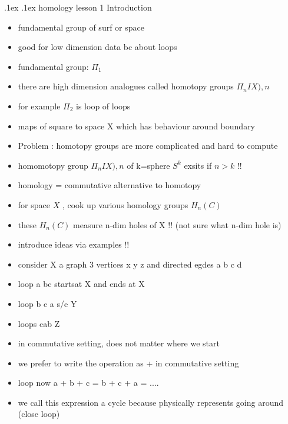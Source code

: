 \documentclass[10pt,landscape,a4paper]{article}
\makeatletter
\renewcommand{\section}{\@startsection{section}{1}{0mm}%
                                {.1ex}%
                                {.1ex}%
                                {\color{blue}\sffamily\small\bfseries}}
\makeatother
\begin{document}
\newcommand{\sucht}{\ \wasytherefore\ }

\pagecolor{light-gray}	
\normalsize

\begin{multicols*}{4}

\begin{spacing}{0.1}

\section{homology lesson 1 Introduction}%
\label{sec:first_lesson}

\begin{itemize}
  \item fundamental group of surf or space
  \item good for low dimension data bc about loops
  \item fundamental group: $ \Pi_{1}  $ 
  \item there are high dimension analogues called homotopy groups  $ \Pi_{n}IX) , n $ 
  \item for example $ \Pi_{2}  $ is loop of loops 
  \item maps of square to space X which has behaviour around boundary
  \item Problem : homotopy groups are more complicated and hard to compute
  \item homomotopy group $ \Pi_{n}IX) , n $ of k=sphere $S^k$ exsits if $n > k$ !!
  \item homology = commutative alternative to homotopy
  \item for space $X$ , cook up various homology groups  $ H_{n}(C)  $ 
  \item these  $ H_{n}(C)  $ measure n-dim holes of X !! (not sure what n-dim hole is)
  \item introduce ideas via examples !!
  \item consider X a graph 3 vertices x y z and directed egdes a b c d
  \item loop a bc startsat X and ends at X
  \item loop b c a  s/e Y
  \item loops cab Z
  \item in commutative setting, does not matter where we start
  \item we prefer to write the operation as + in commutative setting
  \item loop now a + b + c = b + c + a = ....
  \item we call this expression a cycle because physically represents going around (close loop)

\end{itemize}
\end{spacing}
\end{multicols*}
\end{document}
